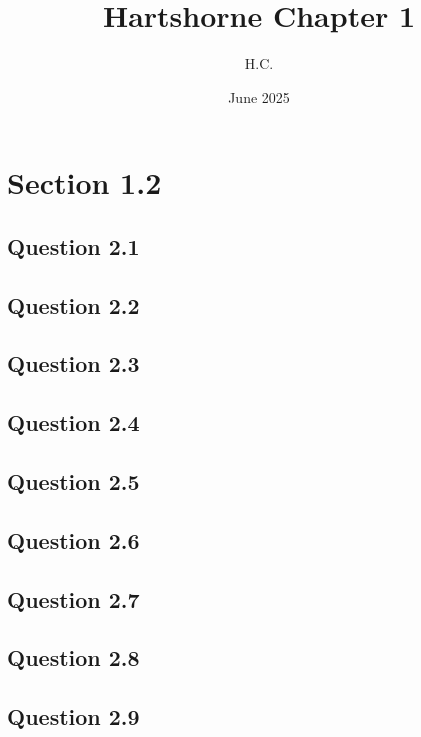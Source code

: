 \documentclass{article}
\title{Hartshorne Chapter 1}
\author{H.C.}
\date{June 2025}
\begin{document}
\maketitle

\section*{Section 1.2}
\subsection*{Question 2.1}



\subsection*{Question 2.2}



\subsection*{Question 2.3}



\subsection*{Question 2.4}



\subsection*{Question 2.5}



\subsection*{Question 2.6}



\subsection*{Question 2.7}


\subsection*{Question 2.8}



\subsection*{Question 2.9}
\end{document}
